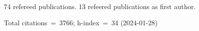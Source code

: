 74 refereed publications. 13 refeered publications as first author.

Total citations~=~3766; h-index~=~34 (2024-01-28)